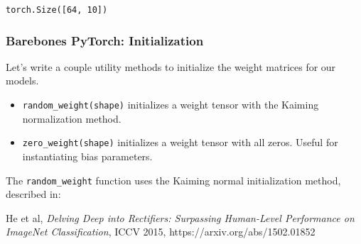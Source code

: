 \documentclass[11pt]{article}
\providecommand{\tightlist}{%
      \setlength{\itemsep}{0pt}\setlength{\parskip}{0pt}}
\begin{document}
    \begin{Verbatim}[commandchars=\\\{\}]
torch.Size([64, 10])

    \end{Verbatim}

    \subsubsection{Barebones PyTorch:
Initialization}\label{barebones-pytorch-initialization}

Let's write a couple utility methods to initialize the weight matrices
for our models.

\begin{itemize}
\tightlist
\item
  \texttt{random\_weight(shape)} initializes a weight tensor with the
  Kaiming normalization method.
\item
  \texttt{zero\_weight(shape)} initializes a weight tensor with all
  zeros. Useful for instantiating bias parameters.
\end{itemize}

The \texttt{random\_weight} function uses the Kaiming normal
initialization method, described in:

He et al, \emph{Delving Deep into Rectifiers: Surpassing Human-Level
Performance on ImageNet Classification}, ICCV 2015,
https://arxiv.org/abs/1502.01852
\end{document}
